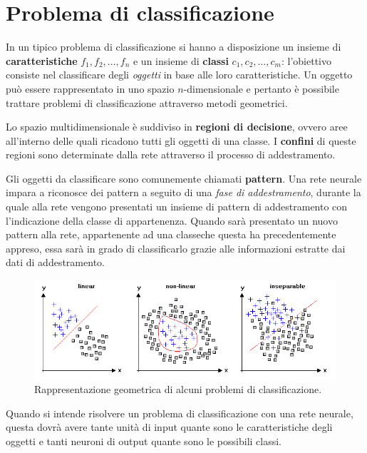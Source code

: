 
\chapter{Problema di classificazione}
\label{cha:problema_di_classificazione}

In un tipico problema di classificazione si hanno a disposizione un insieme di \textbf{caratteristiche} $f_1, f_2, \dots,f_n$ e un insieme di \textbf{classi} $c_1, c_2, \dots, c_m$: l'obiettivo consiste nel classificare degli \emph{oggetti} in base alle loro caratteristiche. Un oggetto può essere rappresentato in uno spazio $n$-dimensionale e pertanto è possibile trattare problemi di classificazione attraverso metodi geometrici.

Lo spazio multidimensionale è suddiviso in \textbf{regioni di decisione}, ovvero aree all'interno delle quali ricadono tutti gli oggetti di una classe. I \textbf{confini} di queste regioni sono determinate dalla rete attraverso il processo di addestramento.

Gli oggetti da classificare sono comunemente chiamati \textbf{pattern}. Una rete neurale impara a riconosce dei pattern a seguito di una \emph{fase di addestramento}, durante la quale alla rete vengono presentati un insieme di pattern di addestramento con l'indicazione della classe di appartenenza. Quando sarà presentato un nuovo pattern alla rete, appartenente ad una classeche questa ha precedentemente appreso, essa sarà in grado di classificarlo grazie alle informazioni estratte dai dati di addestramento.
\begin{figure}[h!]
	\centering
	\includegraphics[width=\textwidth]{images/classify.png}
	\caption[Separabilità lineare nella classificazione.]{Rappresentazione geometrica di alcuni problemi di classificazione.}
\end{figure}

\noindent Quando si intende risolvere un problema di classificazione con una rete neurale, questa dovrà avere tante unità di input quante sono le caratteristiche degli oggetti e tanti neuroni di output quante sono le possibili classi.

